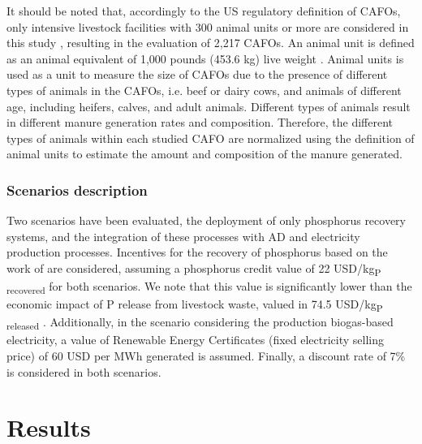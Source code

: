\begin{refsection}[referencesCh4]
It should be noted that, accordingly to the US regulatory definition of CAFOs, only intensive livestock facilities with 300 animal units or more are considered in this study \citep{CAFO_definition}, resulting in the evaluation of 2,217 CAFOs. An animal unit is defined as an animal equivalent of 1,000 pounds (453.6 kg) live weight \citep{animal_unit_definition}. Animal units is used as a unit to measure the size of CAFOs due to the presence of different types of animals in the CAFOs, i.e. beef or dairy cows, and animals of different age, including heifers, calves, and adult animals. Different types of animals result in different manure generation rates and composition. Therefore, the different types of animals within each studied CAFO are normalized using the definition of animal units to estimate the amount and composition of the manure generated.

\subsubsection{Scenarios description}
Two scenarios have been evaluated, the deployment of only phosphorus recovery systems, and the integration of these processes with AD and electricity production processes. 
Incentives for the recovery of phosphorus based on the work of \citet{sampat_economic_2018} are considered, assuming a phosphorus credit value of 22 USD/kg\textsubscript{P recovered} for both scenarios. We note that this value is significantly lower than the economic impact of P release from livestock waste, valued in 74.5 USD/kg\textsubscript{P released} \citep{sampat2021valuing}. Additionally, in the scenario considering the production biogas-based electricity, a value of Renewable Energy Certificates (fixed electricity selling price) of 60 USD per MWh generated is assumed. Finally, a discount rate of 7\% is considered in both scenarios. 

\section{Results}

\end{refsection}
